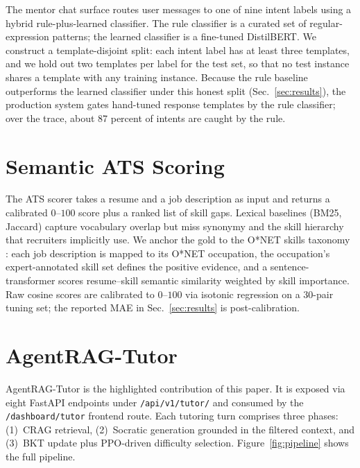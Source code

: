 \documentclass[conference]{IEEEtran}
\begin{document}
The mentor chat surface routes user messages to one of nine intent
labels using a hybrid rule-plus-learned classifier. The rule
classifier is a curated set of regular-expression patterns; the
learned classifier is a fine-tuned DistilBERT. We construct a
template-disjoint split: each intent label has at least three
templates, and we hold out two templates per label for the test set,
so that no test instance shares a template with any training instance.
Because the rule baseline outperforms the learned classifier under
this honest split (Sec.~\ref{sec:results}), the production system
gates hand-tuned response templates by the rule classifier; over the
trace, about 87 percent of intents are caught by the rule.

\section{Semantic ATS Scoring}\label{sec:ats}

The ATS scorer takes a resume and a job description as input and
returns a calibrated $0$--$100$ score plus a ranked list of skill
gaps. Lexical baselines (BM25, Jaccard) capture vocabulary overlap
but miss synonymy and the skill hierarchy that recruiters implicitly
use. We anchor the gold to the O*NET skills taxonomy
\cite{onet2023}: each job description is mapped to its O*NET
occupation, the occupation's expert-annotated skill set defines the
positive evidence, and a sentence-transformer \cite{reimers2019sbert}
scores resume--skill semantic similarity weighted by skill importance.
Raw cosine scores are calibrated to $0$--$100$ via isotonic regression
on a 30-pair tuning set; the reported MAE in Sec.~\ref{sec:results}
is post-calibration.

\section{AgentRAG-Tutor}\label{sec:tutor}

AgentRAG-Tutor is the highlighted contribution of this paper. It is
exposed via eight FastAPI endpoints under \texttt{/api/v1/tutor/} and
consumed by the \texttt{/dashboard/tutor} frontend route. Each
tutoring turn comprises three phases: (1)~CRAG retrieval,
(2)~Socratic generation grounded in the filtered context, and
(3)~BKT update plus PPO-driven difficulty selection.
Figure~\ref{fig:pipeline} shows the full pipeline.
\end{document}
